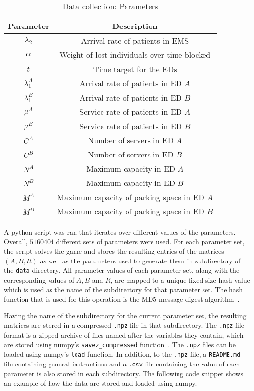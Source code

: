 \begin{table}[H]
    \centering
    \caption{Data collection: Parameters}
    \begin{tabular}{|c|c|}
        \hline
        Parameter & Description \\
        \hline
        \(\lambda_2\) & Arrival rate of patients in EMS \\
        \(\alpha\) & Weight of lost individuals over time blocked \\
        \(t\) & Time target for the EDs \\
        \(\lambda_1^A\) & Arrival rate of patients in ED \(A\) \\
        \(\lambda_1^B\) & Arrival rate of patients in ED \(B\) \\
        \(\mu^A\) & Service rate of patients in ED \(A\) \\
        \(\mu^B\) & Service rate of patients in ED \(B\) \\
        \(C^A\) & Number of servers in ED \(A\) \\
        \(C^B\) & Number of servers in ED \(B\) \\
        \(N^A\) & Maximum capacity in ED \(A\) \\
        \(N^B\) & Maximum capacity in ED \(B\) \\
        \(M^A\) & Maximum capacity of parking space in ED \(A\) \\
        \(M^B\) & Maximum capacity of parking space in ED \(B\) \\
        \hline
    \end{tabular}
    \label{tab:data_collection_parameters}
\end{table}

A python script was ran that iterates over different values of the parameters.
Overall, \(5160404\) different sets of parameters were used.
For each parameter set, the script solves the game and stores the resulting
entries of the matrices \((A, B, R)\) as well as the parameters used to generate
them in subdirectory of the \lstinline{data} directory.
All parameter values of each parameter set, along with the corresponding values
of \(A, B\) and \(R\), are mapped to a unique fixed-size hash value which is
used as the name of the subdirectory for that parameter set.
The hash function that is used for this operation is the MD5 message-digest
algorithm~\cite{rivest1992md5}.

Having the name of the subdirectory for the current parameter set, the resulting
matrices are stored in a compressed \lstinline{.npz} file in that
subdirectory.
The \lstinline{.npz} file format is a zipped archive of files
named after the variables they contain, which are stored using numpy's
\lstinline[style=pystyle]{savez_compressed} function~\cite{2020NumPy-Array}.
The \lstinline{.npz} files can be loaded using numpy's
\lstinline[style=pystyle]{load} function.
In addition, to the \lstinline{.npz} file, a
\lstinline{README.md} file containing general instructions and a
\lstinline{.csv} file containing the value of each parameter is
also stored in each subdirectory.
The following code snippet shows an example of how the data are stored and
loaded using numpy.

